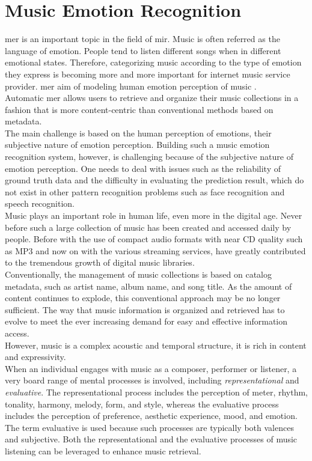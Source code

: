 \section{Music Emotion Recognition}
\gls{mer} is an important topic in the field of \gls{mir}. Music is often referred as the language of emotion. People tend to listen different songs when in different emotional states. Therefore, categorizing music according to the type of emotion they express is becoming more and more important for internet music service provider. \gls{mer} aim of modeling human emotion perception of music \cite{yang2011music}.
\\
Automatic \gls{mer} allows users to retrieve and organize their music collections in a fashion that is more content-centric than conventional methods based on metadata.
\\
The main challenge is based on the human perception of emotions, their subjective nature of emotion perception. 
Building such a music emotion recognition system, however, is challenging because of the subjective nature of emotion perception. One needs to deal with issues such as the reliability of ground truth data and the difficulty in evaluating the prediction result, which do not exist in other pattern recognition problems such as face recognition and speech recognition. 
\\ \indent
Music plays an important role in human life, even more in the digital age. Never before such a large collection of music has been created and accessed daily by people. Before with the use of compact audio formats with near CD quality such as MP3 and now on with the various streaming services, have greatly contributed to the tremendous growth of digital music libraries.
\\ \indent
Conventionally, the management of music collections is based on catalog metadata, such as artist name, album name, and song title. As the amount of content continues to explode, this conventional approach may be no longer sufficient. The way that music information is organized and retrieved has to evolve to meet the ever increasing demand for easy and effective information access.
\\ \indent
However, music is a complex acoustic and temporal structure, it is rich in content and expressivity.
\\
When an individual engages with music as a composer, performer or listener, a very board range of mental processes is involved, including \textit{representational} and \textit{evaluative}. The representational process includes the perception of meter, rhythm, tonality, harmony, melody, form, and style, whereas the evaluative process includes the perception of preference, aesthetic experience, mood, and emotion. The term evaluative is used because such processes are typically both valences and subjective. Both the representational and the evaluative processes of music listening can be leveraged to enhance music retrieval.
